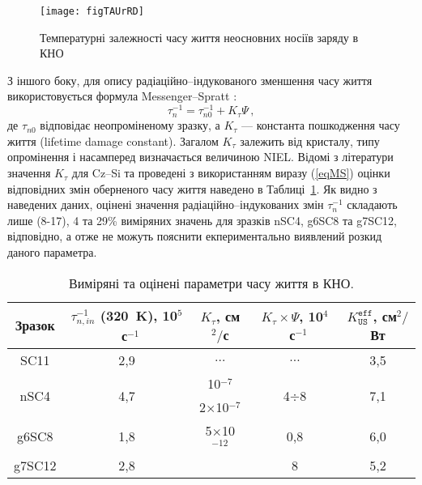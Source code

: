 \begin{figure}[b]
\center
\texttt{[image: figTAUrRD]}
\caption{\label{figTAUrRD}
Температурні залежності часу життя неосновних носіїв заряду в КНО
\FigCaptionSSCRD
}%
\end{figure}

З іншого боку, для опису радіаційно--індукованого зменшення часу життя використовується формула Messenger--Spratt \cite{Markvart}:
\begin{equation}
\label{eqMS}
\tau_n^{-1}=\tau_{n0}^{-1}+K_\tau\Psi\,,
\end{equation}
де
$\tau_{n0}$ відповідає неопроміненому зразку, а
$K_\tau$ --- константа пошкодження часу життя (lifetime damage constant).
Загалом $K_\tau$ залежить від кристалу, типу опромінення і насамперед визначається величиною NIEL.
Відомі з літератури значення $K_\tau$ для Cz--Si та проведені з використанням виразу (\ref{eqMS}) оцінки відповідних
змін оберненого часу життя наведено в Таблиці~\ref{tabTAUn}.
Як видно з наведених даних, оцінені значення радіаційно--індукованих змін $\tau_n^{-1}$ складають лише
(8-17), 4 та 29\% виміряних значень для зразків nSC4, g6SC8 та g7SC12, відповідно, а отже не можуть
пояснити екпериментально виявлений розкид даного параметра.

\begin{table}
\caption{\label{tabTAUn}Виміряні та оцінені параметри часу життя в КНО.
}
\center
\begin{tabular}{|c|c|c|c|c|}
\hline
Зразок &$\tau_{n,in}^{-1}$ (320~K), 10$^5$~с$^{-1}$&$K_\tau$, см$^2/$с&$K_\tau\times\Psi$, 10$^4$~с$^{-1}$&$K_\mathtt{US}^\mathtt{eff}$, см$^2/$Вт\\ \hline
SC11&2,9&$\ldots$&$\ldots$&3,5\\ \hline
\multirow{2}{*}{nSC4}&\multirow{2}{*}{4,7}&10$^{-7}$ \cite{NIEL:Jafari}&\multirow{2}{*}{4$\div$8}&\multirow{2}{*}{7,1}\\ %
&&2$\times$10$^{-7}$ \cite{n:Gaubas}&&\\ \hline
g6SC8&1,8&5$\times$10$^{-12}$&0,8&6,0\\ \cline{1-2} \cline{4-5}%
g7SC12&2,8& \cite{NIEL:Jafari,gamma:Kolkov} &8&5,2\\ \hline
\end{tabular}
\end{table}

